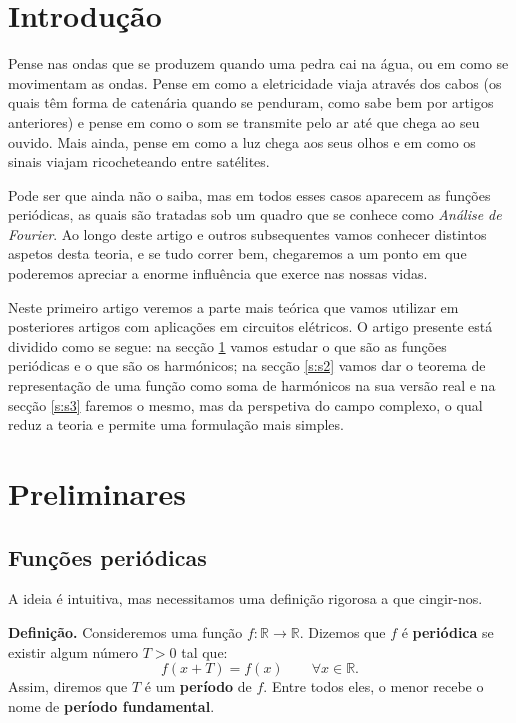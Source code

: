 \section*{Introdução}

Pense nas ondas que se produzem quando uma pedra cai na água, ou em como se movimentam as ondas. Pense em como a eletricidade viaja através dos cabos (os quais têm forma de catenária quando se penduram, como sabe bem por artigos anteriores) e pense em como o som se transmite pelo ar até que chega ao seu ouvido. Mais ainda, pense em como a luz chega aos seus olhos e em como os sinais viajam ricocheteando entre satélites.

Pode ser que ainda não o saiba, mas em todos esses casos aparecem as funções periódicas, as quais são tratadas sob um quadro que se conhece como \textit{Análise de Fourier}. Ao longo deste artigo e outros subsequentes vamos conhecer distintos aspetos desta teoria, e se tudo correr bem, chegaremos a um ponto em que poderemos apreciar a enorme influência que exerce nas nossas vidas.

Neste primeiro artigo veremos a parte mais teórica que vamos utilizar em posteriores artigos com aplicações em circuitos elétricos. O artigo presente está dividido como se segue: na secção \ref{s:s1} vamos estudar o que são as funções periódicas e o que são os harmónicos; na secção \ref{s:s2} vamos dar o teorema de representação de uma função como soma de harmónicos na sua versão real e na secção \ref{s:s3} faremos o mesmo, mas da perspetiva do campo complexo, o qual reduz a teoria e permite uma formulação mais simples.


\section{Preliminares}\label{s:s1}
\subsection{Funções periódicas}
A ideia é intuitiva, mas necessitamos uma definição rigorosa a que cingir-nos.
\begin{mybox}
\textbf{Definição.} Consideremos uma função $f:\mathbb{R}\longrightarrow\mathbb{R}$. Dizemos que $f$ é \textbf{periódica} se existir algum número $T>0$ tal que:
\begin{equation} \label{eq:FuncionPeriodica}
f(x+T) = f(x) \qquad \forall x\in\mathbb{R} .
\end{equation}
Assim, diremos que $T$ é um \textbf{período} de $f$. Entre todos eles, o menor recebe o nome de \textbf{período fundamental}.
\end{mybox}

